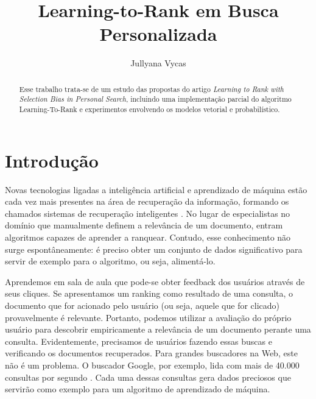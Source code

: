 \documentclass{svproc}
\begin{document}
\mainmatter              %
%
\title{Learning-to-Rank em Busca Personalizada}
%
%
\author{Jullyana Vycas}
%
%
%

\maketitle              %

\begin{abstract}
Esse trabalho trata-se de um estudo das propostas do artigo
\textit{Learning to Rank with Selection Bias in Personal Search}, incluindo
uma implementação parcial do algoritmo Learning-To-Rank e experimentos
envolvendo os modelos vetorial e probabilístico.

\end{abstract}
%
\section{Introdução}
Novas tecnologias ligadas a inteligência artificial e aprendizado de máquina estão cada vez mais presentes na área
de recuperação da informação, formando os chamados sistemas de recuperação inteligentes \cite{chen}. 
No lugar de especialistas no domínio que manualmente definem a relevância de um documento, entram algoritmos capazes 
de aprender a ranquear. Contudo, esse conhecimento não surge espontâneamente: é preciso obter um conjunto de dados
significativo para servir de exemplo para o algoritmo, ou seja, alimentá-lo.

Aprendemos em sala de aula que pode-se obter feedback dos usuários através de seus cliques. Se apresentamos um ranking 
como resultado de uma consulta, o documento que for acionado pelo usuário (ou seja, aquele que for clicado) provavelmente
é relevante. Portanto, podemos utilizar a avaliação do próprio usuário para descobrir empiricamente a relevância de um 
documento perante uma consulta. Evidentemente, precisamos de usuários fazendo essas buscas e verificando os documentos 
recuperados. Para grandes buscadores na Web, este não é um problema. O buscador Google, por exemplo, lida com
mais de 40.000 consultas por segundo \cite{google:search:statistics}. Cada uma dessas consultas gera dados preciosos
que servirão como exemplo para um algoritmo de aprendizado de máquina.
\end{document}
